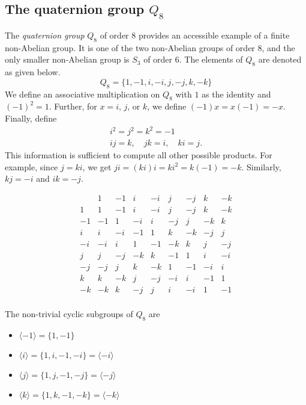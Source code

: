 \documentclass[svgnames]{article}
\theoremstyle{definition}
\theoremstyle{remark}
\begin{document}
\begin{appendices}
\section{The quaternion group $Q_8$}\label{sec:Q8}
The \emph{quaternion group} $Q_8$ of order $8$ provides an accessible example of a finite non-Abelian group. It is one of the two non-Abelian groups of order $8$, and the only smaller non-Abelian group is $S_3$ of order $6$. The elements of $Q_8$ are denoted as given below.
\begin{equation*}
Q_8 = \{1, -1, i, -i, j, -j, k, -k\}
\end{equation*}
We define an associative multiplication on $Q_8$ with $1$ as the identity and $(-1)^2 = 1$. Further, for $x = i$, $j$, or $k$, we define $(-1)x = x(-1) = -x$. Finally, define
\begin{gather*}
i^2 = j^2 = k^2 = -1\\
ij = k, \quad jk = i, \quad ki = j.
\end{gather*}
This information is sufficient to compute all other possible products. For example, since $j = ki$, we get $ji = (ki)i = ki^2 = k(-1) = -k$. Similarly, $kj = -i$ and $ik = -j$.

\begin{equation*}
\begin{array}{r|cccccccc}
	&	1	&	-1	&	i	&	-i	&	j	&	-j	&	k	&	-k\\
\hline
1	&	1	&	-1	&	i	&	-i	&	j	&	-j	&	k	&	-k\\
-1	&	-1	&	1	&	-i	&	i	&	-j	&	j	&	-k	&	k\\
i	&	i	&	-i	&	-1	&	1	&	k	&	-k	&	-j	&	j\\
-i	&	-i	&	i	&	1	&	-1	&	-k	&	k	&	j	&	-j\\
j	&	j	&	-j	&	-k	&	k	&	-1	&	1	&	i	&	-i\\
-j	&	-j	&	j	&	k	&	-k	&	1	&	-1	&	-i	&	i\\
k	&	k	&	-k	&	j	&	-j	&	-i	&	i	&	-1	&	1\\
-k	&	-k	&	k	&	-j	&	j	&	i	&	-i	&	1	&	-1\\
\end{array}
\end{equation*}

The non-trivial cyclic subgroups of $Q_8$ are
\begin{itemize}
\item $\langle -1 \rangle = \{1, -1\}$
\item $\langle i \rangle = \{1, i, -1, -i\} = \langle -i \rangle$
\item $\langle j \rangle = \{1, j, -1, -j\} = \langle -j \rangle$
\item $\langle k \rangle = \{1, k, -1, -k\} = \langle -k \rangle$
\end{itemize}


\end{appendices}
\end{document}
